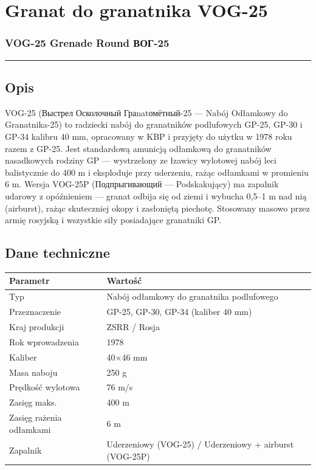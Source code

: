 \documentclass[12pt,openany,oneside]{book}
\begin{document}
\chapter{Granat do granatnika VOG-25}\label{granat-do-granatnika-vog-25}

\subsection{VOG-25 Grenade Round \textbar{}
ВОГ-25}\label{vog-25-grenade-round-ux432ux43eux433-25}

\begin{center}\rule{0.5\linewidth}{0.5pt}\end{center}

\section{Opis}\label{opis-106}

VOG-25 (Выстрел Осколочный Граnatомётный-25 --- Nabój Odłamkowy do
Granatnika-25) to radziecki nabój do granatników podlufowych GP-25,
GP-30 i GP-34 kalibru 40 mm, opracowany w KBP i przyjęty do użytku w
1978 roku razem z GP-25. Jest standardową amunicją odłamkową do
granatników nasadkowych rodziny GP --- wystrzelony ze łzawicy wylotowej
nabój leci balistycznie do 400 m i eksploduje przy uderzeniu, rażąc
odłamkami w promieniu 6 m. Wersja VOG-25P (Подпрыгивающий ---
Podskakujący) ma zapalnik udarowy z opóźnieniem --- granat odbija się od
ziemi i wybucha 0,5--1 m nad nią (airburst), rażąc skuteczniej okopy i
zasłoniętą piechotę. Stosowany masowo przez armię rosyjską i wszystkie
siły posiadające granatniki GP.

\section{Dane techniczne}\label{dane-techniczne-106}

\begin{longtable}[]{@{}ll@{}}
\toprule\noalign{}
Parametr & Wartość \\
\midrule\noalign{}
\endhead
\bottomrule\noalign{}
\endlastfoot
Typ & Nabój odłamkowy do granatnika podlufowego \\
Przeznaczenie & GP-25, GP-30, GP-34 (kaliber 40 mm) \\
Kraj produkcji & ZSRR / Rosja \\
Rok wprowadzenia & 1978 \\
Kaliber & 40×46 mm \\
Masa naboju & 250 g \\
Prędkość wylotowa & 76 m/s \\
Zasięg maks. & 400 m \\
Zasięg rażenia odłamkami & 6 m \\
Zapalnik & Uderzeniowy (VOG-25) / Uderzeniowy + airburst (VOG-25P) \\
\end{longtable}
\end{document}
